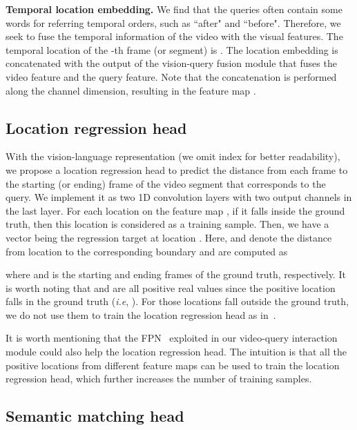 \documentclass[10pt,twocolumn,letterpaper]{article}
\def\ie{\emph{i.e}\onedot} \def\Ie{\emph{I.e}\onedot}
\begin{document}
	


	\noindent \textbf{Temporal location embedding.} We find that the queries often contain some words for referring temporal orders, such as ``after" and ``before". Therefore, we seek to fuse the temporal information of the video with the visual features.
	The temporal location of the -th frame (or segment) is . The location embedding  is concatenated with the output of the vision-query fusion module that fuses the video feature  and the query feature. Note that the concatenation is performed along the channel dimension, resulting in the feature map . 







	


	\subsection{Location regression head}
	\label{sec:regression-head}
	
	With the vision-language representation  (we omit  index  for better readability), we propose a location regression head to predict the distance from each frame to the starting (or ending) frame of the video segment that corresponds to the query.
	We implement it as two 1D convolution layers with two output channels in the last layer. 
	For each location  on the feature map , if it falls inside the ground truth, then this location is considered as a training sample. Then, we have a vector  being the regression target at location . Here,  and  denote the distance from location  to the corresponding boundary and are computed as 
	
	where  and  is the starting and ending frames of the ground truth, respectively. 
	It is worth noting that  and  are all positive real values since the positive location  falls in the ground truth (\ie, ). For those locations fall outside the ground truth, we do not use them to train the location regression head as in~\cite{tian2019fcos}. 
	
	It is worth mentioning that the FPN~\cite{lin2017feature} exploited in our video-query interaction module could also help the location regression head.
	The intuition is that all the positive locations from different feature maps can be used to train the location regression head, which further increases the number of training samples.
	
	
	\subsection{Semantic matching head}
	\label{sec:matching-head}
	
\end{document}
